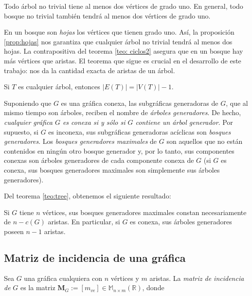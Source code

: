 \begin{prop} \label{prop:hojas}
Todo árbol no trivial tiene al menos dos vértices de grado uno. En general, todo bosque no trivial también tendrá al menos dos vértices de grado uno. 
\end{prop}

 En un bosque son \textit{hojas} los vértices que tienen grado uno. Así, la proposición \ref{prop:hojas} nos garantiza que cualquier árbol no trivial tendrá al menos dos hojas. La contrapositiva del teorema \ref{teo: ciclos2} asegura que en un bosque hay más vértices que aristas. El teorema que sigue es crucial en el desarrollo de este trabajo: nos da la cantidad exacta de aristas de un árbol.

\begin{teo} \label{teo:tree}
Si $T$ es cualquier árbol, entonces $|E(T)| = |V(T)|-1$. 
\end{teo}

Suponiendo que $G$ es una gráfica conexa, las subgráficas generadoras de $G$, que al mismo tiempo son árboles, reciben el nombre de \textit{árboles generadores}.  De hecho, \textit{cualquier gráfica $G$ es conexa si y sólo si $G$ contiene un árbol generador}.  Por supuesto, si $G$ es inconexa, sus subgráficas generadoras acíclicas son \textit{bosques generadores}. Los \textit{bosques generadores maximales} de $G$ son aquellos que no están contenidos en ningún otro bosque generador y, por lo tanto, sus componentes conexas son árboles generadores de cada componente conexa de $G$ (si $G$ es conexa, sus bosques generadores maximales son simplemente sus árboles generadores).

Del teorema \ref{teo:tree}, obtenemos el siguiente resultado:

\begin{teo}
Si $G$ tiene $n$ vértices, sus bosques generadores maximales constan necesariamente de $n-c(G)$ aristas. En particular, si $G$ es conexa, sus árboles generadores poseen $n-1$ aristas.
\end{teo}


        \subsection{Matriz de incidencia de una gráfica} \label{sec:matriz}
Sea $G$ una gráfica cualquiera con $n$ vértices y $m$ aristas. La \textit{matriz de incidencia de} $G$ es la matriz $\mathbf{M}_{G} := [m_{ve}] \in \mathbb{M}_{n \times m}(\mathbb{R})$, donde

